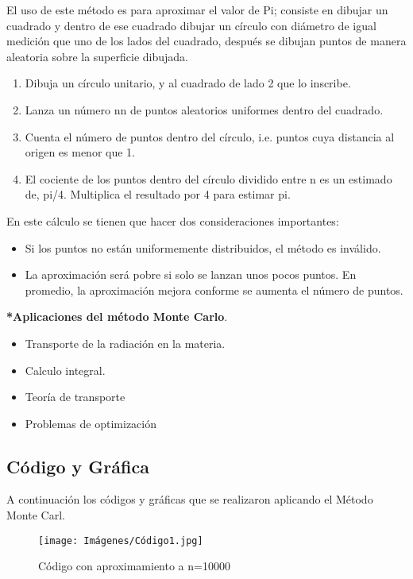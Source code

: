 \documentclass{article}
\begin{document}
El uso de este método es para aproximar el valor de Pi; consiste en dibujar un cuadrado y dentro de ese cuadrado dibujar un círculo con diámetro de igual medición que uno de los lados del cuadrado, después se dibujan puntos de manera aleatoria sobre la superficie dibujada.
\begin{enumerate}
\item Dibuja un círculo unitario, y al cuadrado de lado 2 que lo inscribe.
\item Lanza un número {\displaystyle n}n de puntos aleatorios uniformes dentro del cuadrado.
\item Cuenta el número de puntos dentro del círculo, i.e. puntos cuya distancia al origen es menor que 1.
\item El cociente de los puntos dentro del círculo dividido entre n es un estimado de, pi/4. Multiplica el resultado por 4 para estimar pi.
\end{enumerate}

En este cálculo se tienen que hacer dos consideraciones importantes:

\begin{itemize}
\item Si los puntos no están uniformemente distribuidos, el método es inválido.
\item La aproximación será pobre si solo se lanzan unos pocos puntos. En promedio, la aproximación mejora conforme se aumenta el número de puntos.
\end{itemize}


\textbf{*Aplicaciones del método Monte Carlo}\cite{2}.

\begin{itemize}
\item Transporte de la radiación en la materia.
\item Calculo integral.
\item Teoría de transporte
\item Problemas de optimización
\end{itemize}
\subsection{Código y Gráfica}
A continuación los códigos y gráficas que se realizaron aplicando el Método Monte Carl\cite{3}.


\begin{figure} [htp]%
    \centering
    \texttt{[image: Imágenes/Código1.jpg]} %
    \caption{Código con aproximamiento a n=10000}
    \label{grafica}
\end{figure}
\end{document}
